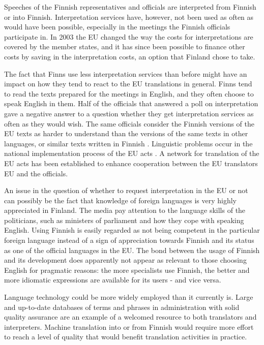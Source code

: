 \documentclass{../../metanetpaper}
\begin{document}
\begin{Parallel}[c]{79mm}{78mm}
{Speeches of the Finnish representatives and officials are interpreted
from Finnish or into Finnish. Interpretation services have, however,
not been used as often as would have been possible, especially in the
meetings the Finnish officials participate in. In 2003 the EU changed
the way the costs for interpretations are covered by the member
states, and it has since been possible to finance other costs by
saving in the interpretation costs, an option that Finland chose to
take.

The fact that Finns use less interpretation services than before might
have an impact on how they tend to react to the EU translations in
general. Finns tend to read the texts prepared for the meetings in
English, and they often choose to speak English in them. Half of the
officials that answered a poll on interpretation gave a negative
answer to a question whether they get interpretation services as often
as they would wish. The same officials consider the Finnish versions
of the EU texts as harder to understand than the versions of the same
texts in other languages, or similar texts written in Finnish
\cite{Piehl2008}. Linguistic problems occur in the national
implementation process of the EU acts \cite{OECD2010}. A network
for translation of the EU acts has been established to enhance
cooperation between the EU translators EU and the officials.

An issue in the question of whether to request interpretation in the
EU or not can possibly be the fact that knowledge of foreign languages
is very highly appreciated in Finland. The media pay attention to the
language skills of the politicians, such as ministers of parliament
and how they cope with speaking English. Using Finnish is easily
regarded as not being competent in the particular foreign language
instead of a sign of appreciation towards Finnish and its status as
one of the official languages in the EU. The bond between the usage of
Finnish and its development does apparently not appear as relevant to
those choosing English for pragmatic reasons: the more specialists use
Finnish, the better and more idiomatic expressions are available for
its users - and vice versa.

Language technology could be more widely employed than it currently
is. Large and up-to-date databases of terms and phrases in
administration with solid quality assurance are an example of a
welcomed resource to both translators and interpreters. Machine
translation into or from Finnish would require more effort to reach a
level of quality that would benefit translation activities in
practice.
}


\end{Parallel}
\end{document}
